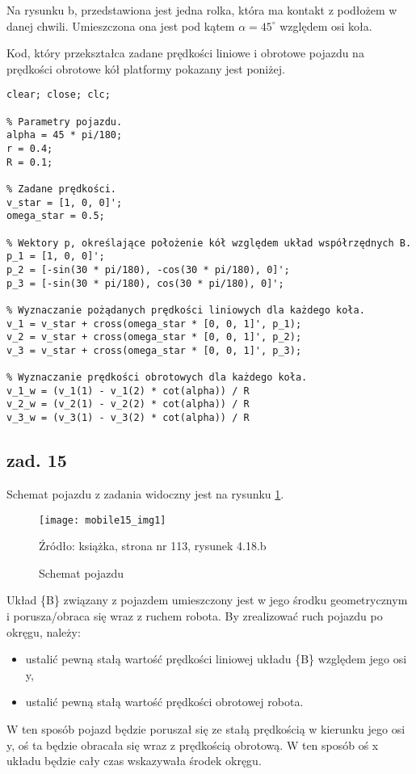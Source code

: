 \documentclass[11pt, a4paper]{article}
\begin{document}
Na rysunku b, przedstawiona jest jedna rolka, która ma kontakt z podłożem w danej chwili. Umieszczona ona jest pod kątem $\alpha = 45^{\circ}$ względem osi koła.

Kod, który przekształca zadane prędkości liniowe i obrotowe pojazdu na prędkości obrotowe kół platformy pokazany jest poniżej.
\begin{lstlisting}
clear; close; clc;

% Parametry pojazdu.
alpha = 45 * pi/180;
r = 0.4;
R = 0.1;

% Zadane prędkości.
v_star = [1, 0, 0]';
omega_star = 0.5;

% Wektory p, określające położenie kół względem układ współrzędnych B.
p_1 = [1, 0, 0]';
p_2 = [-sin(30 * pi/180), -cos(30 * pi/180), 0]';
p_3 = [-sin(30 * pi/180), cos(30 * pi/180), 0]';

% Wyznaczanie pożądanych prędkości liniowych dla każdego koła.
v_1 = v_star + cross(omega_star * [0, 0, 1]', p_1);
v_2 = v_star + cross(omega_star * [0, 0, 1]', p_2);
v_3 = v_star + cross(omega_star * [0, 0, 1]', p_3);

% Wyznaczanie prędkości obrotowych dla każdego koła.
v_1_w = (v_1(1) - v_1(2) * cot(alpha)) / R
v_2_w = (v_2(1) - v_2(2) * cot(alpha)) / R
v_3_w = (v_3(1) - v_3(2) * cot(alpha)) / R
\end{lstlisting}

\subsection*{zad. 15}

Schemat pojazdu z zadania widoczny jest na rysunku \ref{fig:mobile15pojazd}.
\begin{figure}[htbp!]
	\centering
	\texttt{[image: mobile15\_img1]}
	\caption{Schemat pojazdu \label{fig:mobile15pojazd}}
	Źródło: książka, strona nr 113, rysunek 4.18.b
\end{figure}

Układ \{B\} związany z pojazdem umieszczony jest w jego środku geometrycznym i porusza/obraca się wraz z ruchem robota. By zrealizować ruch pojazdu po okręgu, należy:
\begin{itemize}
\item ustalić pewną stałą wartość prędkości liniowej układu \{B\} względem jego osi y,
\item ustalić pewną stałą wartość prędkości obrotowej robota.
\end{itemize}

W ten sposób pojazd będzie poruszał się ze stałą prędkością w kierunku jego osi y, oś ta będzie obracała się wraz z prędkością obrotową. W ten sposób oś x układu będzie cały czas wskazywała środek okręgu.
\end{document}
